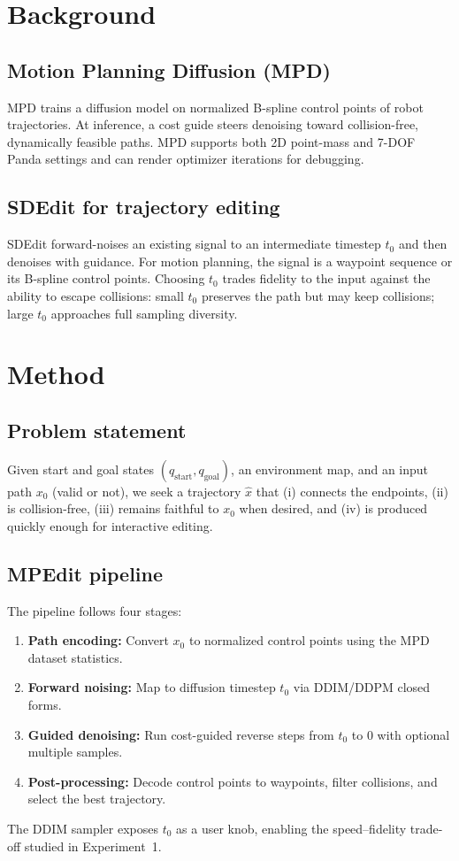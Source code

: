 \documentclass[12pt]{article}
\begin{document}
\section{Background}
\subsection{Motion Planning Diffusion (MPD)}
MPD trains a diffusion model on normalized B-spline control points of robot trajectories. At inference, a cost guide steers denoising toward collision-free, dynamically feasible paths. MPD supports both 2D point-mass and 7-DOF Panda settings and can render optimizer iterations for debugging.

\subsection{SDEdit for trajectory editing}
SDEdit forward-noises an existing signal to an intermediate timestep $t_{0}$ and then denoises with guidance. For motion planning, the signal is a waypoint sequence or its B-spline control points. Choosing $t_{0}$ trades fidelity to the input against the ability to escape collisions: small $t_{0}$ preserves the path but may keep collisions; large $t_{0}$ approaches full sampling diversity.

\section{Method}
\subsection{Problem statement}
Given start and goal states $(q_{\text{start}}, q_{\text{goal}})$, an environment map, and an input path $x_{0}$ (valid or not), we seek a trajectory $\hat{x}$ that (i) connects the endpoints, (ii) is collision-free, (iii) remains faithful to $x_{0}$ when desired, and (iv) is produced quickly enough for interactive editing.

\subsection{MPEdit pipeline}
The pipeline follows four stages:
\begin{enumerate}[leftmargin=*]
  \item \textbf{Path encoding:} Convert $x_{0}$ to normalized control points using the MPD dataset statistics.
  \item \textbf{Forward noising:} Map to diffusion timestep $t_{0}$ via DDIM/DDPM closed forms.
  \item \textbf{Guided denoising:} Run cost-guided reverse steps from $t_{0}$ to 0 with optional multiple samples.
  \item \textbf{Post-processing:} Decode control points to waypoints, filter collisions, and select the best trajectory.
\end{enumerate}
The DDIM sampler exposes $t_{0}$ as a user knob, enabling the speed--fidelity trade-off studied in Experiment~1.
\end{document}
